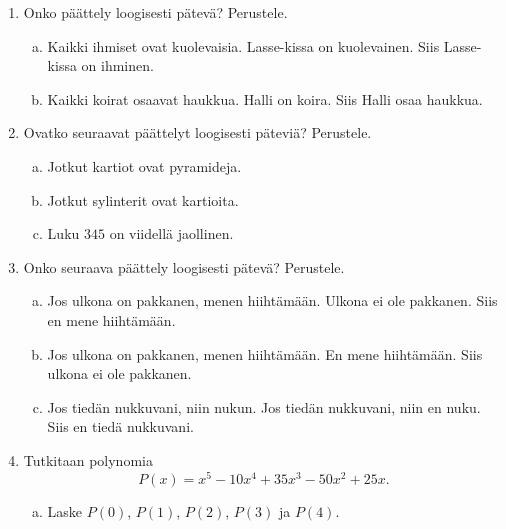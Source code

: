 \begin{enumerate}
    \item Onko päättely loogisesti pätevä? Perustele.
        \begin{enumerate}[a)]
            \item Kaikki ihmiset ovat kuolevaisia. Lasse-kissa on kuolevainen. Siis Lasse-kissa on ihminen.
            \item Kaikki koirat osaavat haukkua. Halli on koira. Siis Halli osaa haukkua.
        \end{enumerate}
    \item Ovatko seuraavat päättelyt loogisesti päteviä? Perustele.
        \begin{enumerate}[a)]
            \item {}
                {Jotkut kartiot ovat pyramideja.}
            \item {}
                {Jotkut sylinterit ovat kartioita.}
            \item {}
                {Luku $345$ on viidellä jaollinen.}
        \end{enumerate}
    \item Onko seuraava päättely loogisesti pätevä? Perustele.
        \begin{enumerate}[a)]
            \item Jos ulkona on pakkanen, menen hiihtämään. Ulkona ei ole pakkanen. Siis en mene hiihtämään.
            \item Jos ulkona on pakkanen, menen hiihtämään. En mene hiihtämään. Siis ulkona ei ole pakkanen.
            \item Jos tiedän nukkuvani, niin nukun. Jos tiedän nukkuvani, niin en nuku. Siis en tiedä nukkuvani.
        \end{enumerate}
    \item Tutkitaan polynomia
        \[ P(x) = x^5 -10x^4+35x^3 -50 x^2 +25x. \]
        \begin{enumerate}[a)]
            \item Laske $P(0)$, $P(1)$, $P(2)$, $P(3)$ ja $P(4)$.

\end{enumerate}
\end{enumerate}
